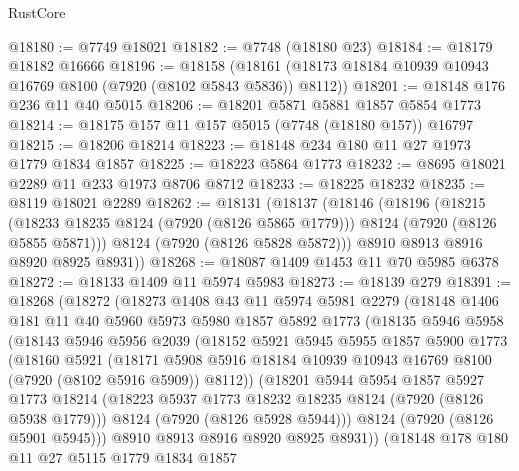 \begin{lexlean}{RustCore}
\begin{coremodule}
@18180 := @7749 @18021
@18182 := @7748 (@18180 @23)
@18184 := @18179 @18182 @16666
@18196 := @18158
    (@18161 (@18173 @18184 @10939 @10943 @16769 @8100 (@7920 (@8102 @5843 @5836)) @8112))
@18201 := @18148 @176 @236 @11 @40 @5015
@18206 := @18201 @5871 @5881 @1857 @5854 @1773
@18214 := @18175 @157 @11 @157 @5015 (@7748 (@18180 @157)) @16797
@18215 := @18206 @18214
@18223 := @18148 @234 @180 @11 @27 @1973 @1779 @1834 @1857
@18225 := @18223 @5864 @1773
@18232 := @8695 @18021 @2289 @11 @233 @1973 @8706 @8712
@18233 := @18225 @18232
@18235 := @8119 @18021 @2289
@18262 := @18131
    (@18137
      (@18146
        (@18196
          (@18215
            (@18233 @18235 @8124 (@7920 (@8126 @5865 @1779)))
            @8124
            (@7920 (@8126 @5855 @5871)))
          @8124
          (@7920 (@8126 @5828 @5872)))
        @8910
        @8913
        @8916
        @8920
        @8925
        @8931))
@18268 := @18087 @1409 @1453 @11 @70 @5985 @6378
@18272 := @18133 @1409 @11 @5974 @5983
@18273 := @18139 @279
@18391 := @18268
    (@18272
      (@18273
        @1408
        @43
        @11
        @5974
        @5981
        @2279
        (@18148
          @1406
          @181
          @11
          @40
          @5960
          @5973
          @5980
          @1857
          @5892
          @1773
          (@18135
            @5946
            @5958
            (@18143
              @5946
              @5956
              @2039
              (@18152
                @5921
                @5945
                @5955
                @1857
                @5900
                @1773
                (@18160
                  @5921
                  (@18171
                    @5908
                    @5916
                    @18184
                    @10939
                    @10943
                    @16769
                    @8100
                    (@7920 (@8102 @5916 @5909))
                    @8112))
                (@18201
                  @5944
                  @5954
                  @1857
                  @5927
                  @1773
                  @18214
                  (@18223 @5937 @1773 @18232 @18235 @8124 (@7920 (@8126 @5938 @1779)))
                  @8124
                  (@7920 (@8126 @5928 @5944)))
                @8124
                (@7920 (@8126 @5901 @5945)))
              @8910
              @8913
              @8916
              @8920
              @8925
              @8931))
          (@18148
            @178
            @180
            @11
            @27
            @5115
            @1779
            @1834
            @1857

\end{coremodule}
\end{lexlean}
